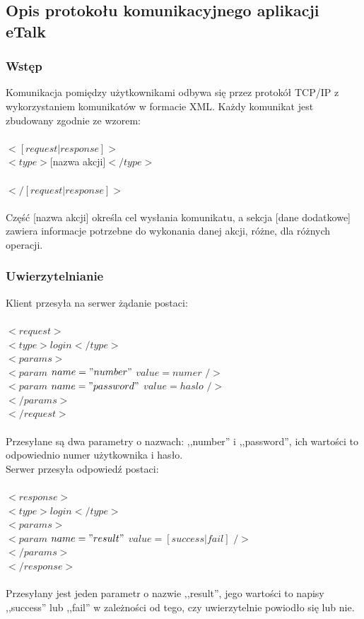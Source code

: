 \documentclass[a4paper,12pt]{article}
\begin{document}
\subsection[Opis protokołu komunikacyjnego aplikacji eTalk]{Opis protokołu komunikacyjnego aplikacji eTalk}
\subsubsection[Wstęp]{Wstęp}
Komunikacja pomiędzy użytkownikami odbywa się przez protokół TCP/IP z wykorzystaniem
komunikatów w formacie XML. Każdy komunikat jest zbudowany zgodnie ze
wzorem:\\\\
\noindent  $<[request|response]>$\\
\indent    $<type>$[nazwa akcji]$</type>$\\
\\
$</[request|response]>$\\\\

\noindent Część [nazwa akcji] określa cel wysłania komunikatu, a sekcja [dane dodatkowe] zawiera
informacje potrzebne do wykonania danej akcji, różne, dla różnych operacji.

\subsubsection[Uwierzytelnianie]{Uwierzytelnianie}
Klient przesyła na serwer żądanie postaci:\\\\
\noindent  $<request>$\\
\indent    $<type>login</type>$\\
\indent    $<params>$\\
\indent \indent $<param$ $name="number"$ $value=numer$ $/>$\\
\indent \indent $<param$ $name="password"$ $value=haslo$ $/>$\\
\indent    $</params>$\\
$</request>$\\\\

\noindent Przesyłane są dwa parametry o nazwach: ,,number'' i ,,password'', ich wartości to odpowiednio numer użytkownika i hasło.\\
Serwer przesyła odpowiedź postaci:\\\\
\noindent  $<response>$\\
\indent    $<type>login</type>$\\
\indent    $<params>$\\
\indent \indent $<param$ $name="result"$ $value=[success|fail]$ $/>$\\
\indent    $</params>$\\
$</response>$\\\\
\noindent Przesyłany jest jeden parametr o nazwie ,,result'', jego wartości to napisy ,,success'' lub ,,fail'' w zależności od tego, czy uwierzytelnie powiodło się lub nie.
\end{document}
